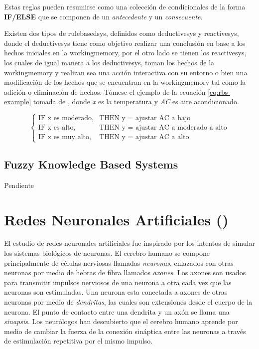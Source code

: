 Estas reglas pueden resumirse como una colección de condicionales de la forma \textbf{IF/ELSE} que se componen de un \emph{antecedente} y un \emph{consecuente}.

Existen dos tipos de \gls{rulebasedsys}, definidos como \gls{deductivesys} y \gls{reactivesys}, donde el \gls{deductivesys} tiene como objetivo realizar una conclusión en base a los hechos iniciales en la \gls{workingmemory}, por el otro lado se tienen los \gls{reactivesys}, los cuales de igual manera a los \gls{deductivesys}, toman los hechos de la \gls{workingmemory} y realizan sea una acción interactiva con su entorno o bien una modificación de los hechos que se encuentran en la \gls{workingmemory} tal como la adición o eliminación de hechos. Tómese el ejemplo de la ecuación \ref{eq:rbs-example} tomada de \cite{Mendel}, donde \emph{x} es la temperatura y \emph{AC} es aire acondicionado.

\begin{equation} \label{eq:rbs-example}
  \left\{ \begin{array}{ll}
            \text{IF x es moderado,} & \text{THEN y = ajustar AC a bajo} \\
            \text{IF x es alto,}     & \text{THEN y = ajustar AC a moderado a alto} \\
            \text{IF x es muy alto,} & \text{THEN y = ajustar AC a alto} 
          \end{array} \right.
\end{equation}

\subsection{Fuzzy Knowledge Based Systems}
Pendiente



\section{Redes Neuronales Artificiales ()} \label{sec:ANN}
El estudio de redes neuronales artificiales fue inspirado por los intentos de simular los sistemas biológicos de neuronas. El cerebro humano se compone principalmente de células nerviosas llamadas \emph{neuronas}, enlazados con otras neuronas por medio de hebras de fibra llamados \emph{axones}. Los axones son usados para transmitir impulsos nerviosos de una neurona a otra cada vez que las neuronas son estimuladas. Una neurona esta conectada a axones de otras neuronas por medio de \emph{dendritas}, las cuales son extensiones desde el cuerpo de la neurona. El punto de contacto entre una dendrita y un axón se llama una \emph{sinapsis}. Los neurólogos han descubierto que el cerebro humano aprende por medio de cambiar la fuerza de la conexión sináptica entre las neuronas a través de estimulación repetitiva por el mismo impulso.

